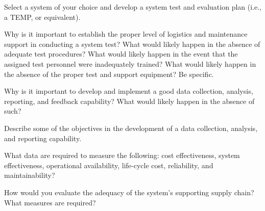 \begin{exercises}
    \begin{exercise}
    \label{sea-06-07}
        Select a system of your choice and develop a system test and evaluation plan (i.e., a TEMP, or equivalent).
    \end{exercise}
    \begin{solution}
    \end{solution}
    
    \begin{exercise}
    \label{sea-06-08}
        Why is it important to establish the proper level of logistics and maintenance support in conducting a system test? What would likely happen in the absence of adequate test procedures? What would likely happen in the event that the assigned test personnel were inadequately trained? What would likely happen in the absence of the proper test and support equipment? Be specific.
    \end{exercise}
    \begin{solution}
    \end{solution}
    
    \begin{exercise}
    \label{sea-06-09}
        Why is it important to develop and implement a good data collection, analysis, reporting, and feedback capability? What would likely happen in the absence of such?
    \end{exercise}
    \begin{solution}
    \end{solution}
    
    \begin{exercise}
    \label{sea-06-10}
        Describe some of the objectives in the development of a data collection, analysis, and reporting capability.
    \end{exercise}
    \begin{solution}
    \end{solution}
    
    \begin{exercise}
    \label{sea-06-11}
        What data are required to measure the following: cost effectiveness, system effectiveness, operational availability, life-cycle cost, reliability, and maintainability?
    \end{exercise}
    \begin{solution}
    \end{solution}
    
    \begin{exercise}
    \label{sea-06-12}
        How would you evaluate the adequacy of the system’s supporting supply chain?  What measures are required?
    \end{exercise}
    \begin{solution}
    \end{solution}
    

\end{exercises}
